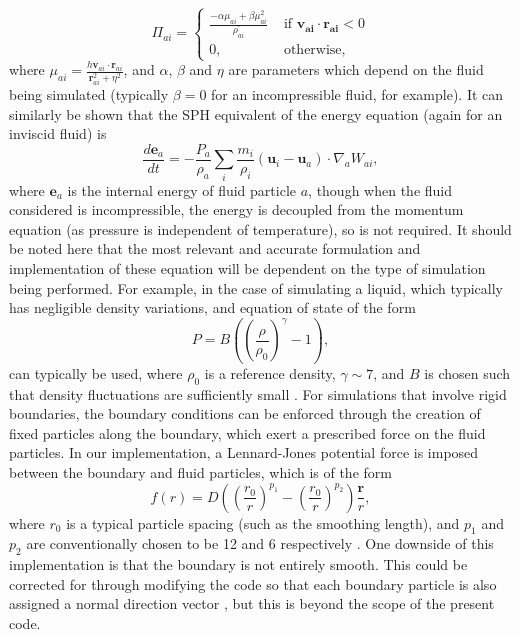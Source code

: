 \documentclass[11pt]{article}
\begin{document}
\begin{equation}
\Pi_{ai}  =\begin{cases}
   \frac{ -\alpha \mu_{ai}+\beta \mu_{ai}^2}{\bar{\rho_{ai}}} & \text{\ \ if $\bm{v_{ai}}\cdot\bm{r_{ai}}<0$}\\
    0, & \text{\ \ otherwise,} 
  \end{cases}
\end{equation}
where $\mu_{ai} = \frac{h \mathbf{v}_{ai} \cdot \mathbf{r}_{ai}}{\mathbf{r}_{ai}^2+\eta^2}$, and $\alpha$, $\beta$ and $\eta$ are parameters which depend on the fluid being simulated (typically $\beta =0$ for an incompressible fluid, for example). It can similarly be shown that the SPH equivalent of the energy equation (again for an inviscid fluid) is
\begin{equation}
\frac{d\bm{e}_a}{d t} = - \frac{P_a}{\rho_a} \sum_{i} \frac{m_i}{\rho_i}(\bm{u}_i - \bm{u}_a)  \cdot \nabla_a W_{ai}\label{eq:SPHEN},
\end{equation}
where $\bm{e}_a$ is the internal energy of fluid particle $a$, though when the fluid considered is incompressible, the energy is decoupled from the momentum equation (as pressure is independent of temperature), so is not required. It should be noted here that the most relevant and accurate formulation and implementation of these equation will be dependent on the type of simulation being performed. For example, in the case of simulating a liquid, which typically has negligible density variations, and equation of state of the form
\begin{equation}
P = B\left(\left(\frac{\rho}{\rho_0}\right)^{\gamma}-1\right),
\end{equation}
can typically be used, where $\rho_0$ is a reference density, $\gamma \sim 7$, and $B$ is chosen such that density fluctuations are sufficiently small \cite{Mon05}. For simulations that involve rigid boundaries, the boundary conditions can be enforced through the creation of fixed particles along the boundary, which exert a prescribed force on the fluid particles. In our implementation, a Lennard-Jones potential force is imposed between the boundary and fluid particles, which is of the form 
\begin{equation}
f(r) = D \left(\left(\frac{r_0}{r}\right)^{p_1} - \left(\frac{r_0}{r}\right)^{p_2}\right)\frac{\bm{r}}{r},
\end{equation}
where $r_0$ is a typical particle spacing (such as the smoothing length), and $p_1$ and $p_2$ are conventionally chosen to be 12 and 6 respectively \cite{Mon94}. One downside of this implementation is that the boundary is not entirely smooth. This could be corrected for through modifying the code so that each boundary particle is also assigned a normal direction vector \cite{Mon05}, but this is beyond the scope of the present code.
\end{document}
